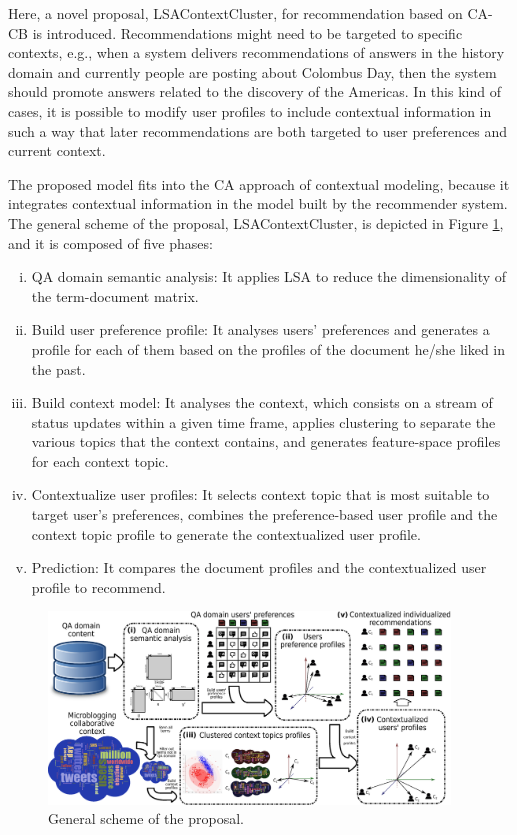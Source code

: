\documentclass[preprint]{elsarticle}
\begin{document}
\begin{spacing}{1.5}
Here, a novel proposal, LSAContextCluster, for recommendation based on CA-CB is introduced. Recommendations might need to be targeted to specific contexts, e.g., when a system delivers recommendations of answers in the history domain and currently people are posting about Colombus Day, then the system should promote answers related to the discovery of the Americas. In this kind of cases, it is possible to modify user profiles to include contextual information in such a way that later recommendations are both targeted to user preferences and current context.

The proposed model fits into the CA approach of contextual modeling, because it integrates contextual information in the model built by the recommender system. The general scheme of the proposal, LSAContextCluster, is depicted in Figure \ref{fig:proposal-scheme}, and it is composed of five phases:
\begin{enumerate}[(i)]
	\item QA domain semantic analysis: It applies LSA to reduce the dimensionality of the term-document matrix.
	\item Build user preference profile: It analyses users' preferences and generates a profile for each of them based on the profiles of the document he/she liked in the past.
	\item Build context model: It analyses the context, which consists on a stream of status updates within a given time frame, applies clustering to separate the various topics that the context contains, and generates feature-space profiles for each context topic.
	\item Contextualize user profiles: It selects context topic that is most suitable to target user's preferences, combines the preference-based user profile and the context topic profile to generate the contextualized user profile.
	\item Prediction: It compares the document profiles and the contextualized user profile to recommend.
\end{enumerate}

\begin{figure}[h]
	\centering
	\includegraphics[width=0.95\textwidth]{figures/proposal-scheme-v5.eps}
	\caption{General scheme of the proposal.}
	\label{fig:proposal-scheme}
\end{figure}


\end{spacing}
\end{document}
